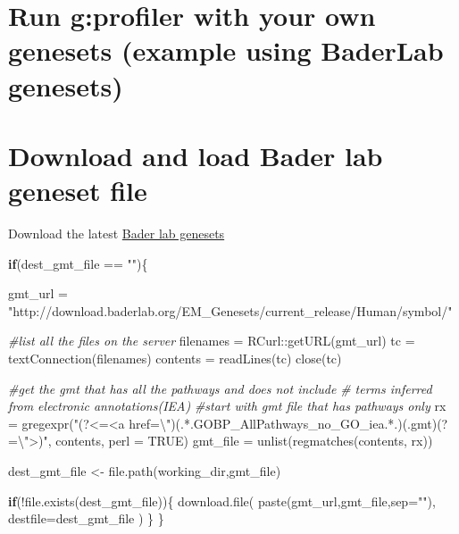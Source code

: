 \documentclass[
]{book}
\newenvironment{Shaded}{\begin{snugshade}}{\end{snugshade}}
\newcommand{\AttributeTok}[1]{\textcolor[rgb]{0.77,0.63,0.00}{#1}}
\newcommand{\CommentTok}[1]{\textcolor[rgb]{0.56,0.35,0.01}{\textit{#1}}}
\newcommand{\ConstantTok}[1]{\textcolor[rgb]{0.00,0.00,0.00}{#1}}
\newcommand{\ControlFlowTok}[1]{\textcolor[rgb]{0.13,0.29,0.53}{\textbf{#1}}}
\newcommand{\FunctionTok}[1]{\textcolor[rgb]{0.00,0.00,0.00}{#1}}
\newcommand{\NormalTok}[1]{#1}
\newcommand{\OtherTok}[1]{\textcolor[rgb]{0.56,0.35,0.01}{#1}}
\newcommand{\SpecialCharTok}[1]{\textcolor[rgb]{0.00,0.00,0.00}{#1}}
\newcommand{\StringTok}[1]{\textcolor[rgb]{0.31,0.60,0.02}{#1}}
\begin{document}
\hypertarget{run-gprofiler-with-your-own-genesets-example-using-baderlab-genesets}{%
\section{Run g:profiler with your own genesets (example using BaderLab genesets)}\label{run-gprofiler-with-your-own-genesets-example-using-baderlab-genesets}}

\hypertarget{download-and-load-bader-lab-geneset-file}{%
\section{Download and load Bader lab geneset file}\label{download-and-load-bader-lab-geneset-file}}

Download the latest \href{https://download.baderlab.org/EM_Genesets/current_release/Human/}{Bader lab genesets}

\begin{Shaded}
\begin{Highlighting}[]
\ControlFlowTok{if}\NormalTok{(dest\_gmt\_file }\SpecialCharTok{==} \StringTok{""}\NormalTok{)\{}

\NormalTok{  gmt\_url }\OtherTok{=} \StringTok{"http://download.baderlab.org/EM\_Genesets/current\_release/Human/symbol/"}

  \CommentTok{\#list all the files on the server}
\NormalTok{  filenames }\OtherTok{=}\NormalTok{ RCurl}\SpecialCharTok{::}\FunctionTok{getURL}\NormalTok{(gmt\_url)}
\NormalTok{  tc }\OtherTok{=} \FunctionTok{textConnection}\NormalTok{(filenames)}
\NormalTok{  contents }\OtherTok{=} \FunctionTok{readLines}\NormalTok{(tc)}
  \FunctionTok{close}\NormalTok{(tc)}
  
  \CommentTok{\#get the gmt that has all the pathways and does not include }
  \CommentTok{\# terms inferred from electronic annotations(IEA)}
  \CommentTok{\#start with gmt file that has pathways only}
\NormalTok{  rx }\OtherTok{=} \FunctionTok{gregexpr}\NormalTok{(}\StringTok{"(?\textless{}=\textless{}a href=}\SpecialCharTok{\textbackslash{}"}\StringTok{)(.*.GOBP\_AllPathways\_no\_GO\_iea.*.)(.gmt)(?=}\SpecialCharTok{\textbackslash{}"}\StringTok{\textgreater{})"}\NormalTok{,}
\NormalTok{    contents, }\AttributeTok{perl =} \ConstantTok{TRUE}\NormalTok{)}
\NormalTok{  gmt\_file }\OtherTok{=} \FunctionTok{unlist}\NormalTok{(}\FunctionTok{regmatches}\NormalTok{(contents, rx))}
  
\NormalTok{  dest\_gmt\_file }\OtherTok{\textless{}{-}} \FunctionTok{file.path}\NormalTok{(working\_dir,gmt\_file)}
  
  \ControlFlowTok{if}\NormalTok{(}\SpecialCharTok{!}\FunctionTok{file.exists}\NormalTok{(dest\_gmt\_file))\{}
    \FunctionTok{download.file}\NormalTok{(}
      \FunctionTok{paste}\NormalTok{(gmt\_url,gmt\_file,}\AttributeTok{sep=}\StringTok{""}\NormalTok{),}
      \AttributeTok{destfile=}\NormalTok{dest\_gmt\_file}
\NormalTok{    )}
\NormalTok{  \}}
\NormalTok{\}}
\end{Highlighting}
\end{Shaded}
\end{document}
